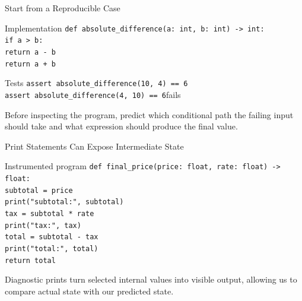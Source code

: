 \documentclass[aspectratio=169,10pt]{beamer}
\begin{document}
\begin{frame}{Start from a Reproducible Case}
  \begin{block}{Implementation}
    \texttt{def absolute\_difference(a: int, b: int) -> int:}\\
    \hspace*{0.20in}\texttt{if a > b:}\\
    \hspace*{0.40in}\texttt{return a - b}\\
    \hspace*{0.20in}\texttt{return a + b}
  \end{block}

  \begin{block}{Tests}
    \texttt{assert absolute\_difference(10, 4) == 6}\quad \checkmark\\
    \texttt{assert absolute\_difference(4, 10) == 6}\quad fails
  \end{block}

  \begin{activity}
    Before inspecting the program, predict which conditional path the failing input should take and what expression should produce the final value.
  \end{activity}
\end{frame}


\begin{frame}{Print Statements Can Expose Intermediate State}
  \begin{block}{Instrumented program}
    \texttt{def final\_price(price: float, rate: float) -> float:}\\
    \hspace*{0.20in}\texttt{subtotal = price}\\
    \hspace*{0.20in}\texttt{print("subtotal:", subtotal)}\\
    \hspace*{0.20in}\texttt{tax = subtotal * rate}\\
    \hspace*{0.20in}\texttt{print("tax:", tax)}\\
    \hspace*{0.20in}\texttt{total = subtotal - tax}\\
    \hspace*{0.20in}\texttt{print("total:", total)}\\
    \hspace*{0.20in}\texttt{return total}
  \end{block}

  \begin{keyidea}
    Diagnostic prints turn selected internal values into visible output, allowing us to compare actual state with our predicted state.
  \end{keyidea}
\end{frame}
\end{document}
